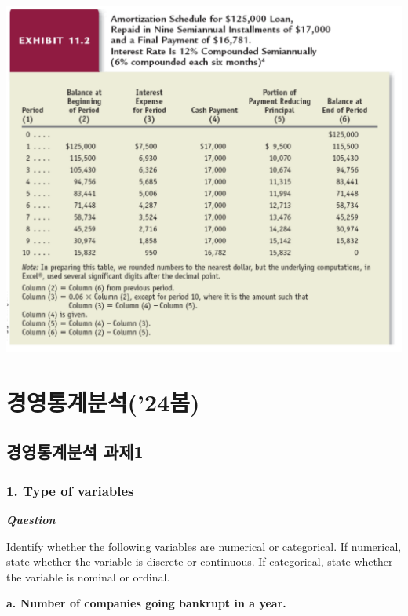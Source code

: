 \documentclass[
  a4paper,
  DIV=11,
  numbers=noendperiod]{scrreprt}
\begin{document}
\includegraphics{images/재무회계_11-19b.png}

\part{경영통계분석('24봄)}

\chapter*{경영통계분석
과제1}\label{uxacbduxc601uxd1b5uxacc4uxbd84uxc11d-uxacfcuxc81c1}


\section*{1. Type of variables}\label{type-of-variables}


\textbf{\emph{Question}}

Identify whether the following variables are numerical or categorical.
If numerical, state whether the variable is discrete or continuous. If
categorical, state whether the variable is nominal or ordinal.

\textbf{a. Number of companies going bankrupt in a year.}
\end{document}
